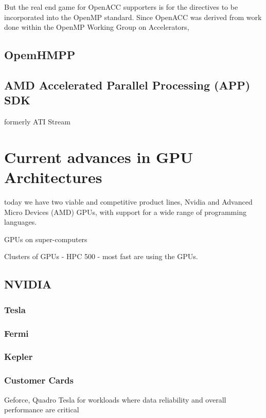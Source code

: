 But the real end game for OpenACC supporters is for the directives to be incorporated into the OpenMP standard.  Since OpenACC was derived from work done within the OpenMP Working Group on Accelerators,

\subsection{OpemHMPP}

\subsection{AMD Accelerated Parallel Processing (APP) SDK}
formerly ATI Stream





\section{Current advances in GPU Architectures}
today we have two viable and
competitive product lines, Nvidia and Advanced
Micro Devices (AMD) GPUs, with support for a
wide range of programming languages.

GPUs on super-computers

Clusters of GPUs - HPC 500 - most fast are using the GPUs.

\subsection{NVIDIA}
\subsubsection{Tesla}
\subsubsection{Fermi}
\subsubsection{Kepler}

\subsubsection{Customer Cards}
Geforce, Quadro
Tesla for workloads where data reliability and overall performance are critical 

